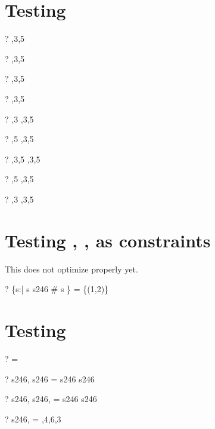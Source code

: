 \documentclass{article}
\begin{document}
\section{Testing \inseq}
\begin{zed} \vdash? \langle \rangle  \in   {},3,5 \rangle \end{zed}
\begin{zed} \vdash?  \rangle  \in   {},3,5 \rangle \end{zed}
\begin{zed} \vdash?  \rangle  \in   {},3,5 \rangle \end{zed}
\begin{zed} \vdash?  \rangle  \in   {},3,5 \rangle \end{zed}
\begin{zed} \vdash? ,3 \rangle  \in   {},3,5 \rangle \end{zed}
\begin{zed} \vdash? ,5 \rangle  \in   {},3,5 \rangle \end{zed}
\begin{zed} \vdash? ,3,5 \rangle  \in   {},3,5 \rangle \end{zed}
\begin{zed} \vdash? \lnot {},5 \rangle  \in   {},3,5 \rangle \end{zed}
\begin{zed} \vdash? \lnot {},3 \rangle  \in   {},3,5 \rangle \end{zed}

\section{Testing \prefix, \suffix, \inseq as constraints}
 This does not optimize properly yet.  
 \begin{zed} \vdash? \{s:\seq \nat | s \prefix s246 \land \# s \} = \power \{(1,2)\} \end{zed}

\section{Testing \dcat}
\begin{zed} \vdash? \dcat \langle \rangle = \langle \rangle \end{zed}
\begin{zed} \vdash? \dcat \langle s246, s246 \rangle = s246 \cat s246 \end{zed}
\begin{zed} \vdash? \dcat \langle s246, s246, \emptyset \rangle = s246 \cat s246 \end{zed}
\begin{zed} \vdash? \dcat \langle s246,  \rangle \rangle = ,4,6,3 \rangle \end{zed}
\end{document}
